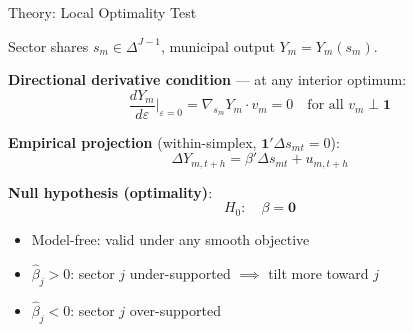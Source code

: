 \documentclass[aspectratio=169,11pt]{beamer}
\newcommand{\iotaVec}{\mathbf{1}}
\begin{document}
\begin{frame}{Theory: Local Optimality Test}

Sector shares $s_m \in \Delta^{J-1}$, municipal output $Y_m = Y_m(s_m)$.

\medskip

\textbf{Directional derivative condition} --- at any interior optimum:
\begin{equation*}
    \frac{dY_m}{d\varepsilon}\bigg|_{\varepsilon=0}
    = \nabla_{s_m} Y_m \cdot v_m = 0
    \quad\text{for all } v_m \perp \iotaVec
\end{equation*}

\textbf{Empirical projection} (within-simplex, $\iotaVec'\Delta s_{mt}=0$):
\begin{equation*}
    \Delta Y_{m,t+h} = \beta' \Delta s_{mt} + u_{m,t+h}
\end{equation*}

\textbf{Null hypothesis (optimality)}:
\begin{equation*}
    H_0: \quad \beta = \mathbf{0}
\end{equation*}

\begin{itemize}
    \item Model-free: valid under any smooth objective
    \item $\hat\beta_j > 0$: sector $j$ under-supported $\implies$ tilt more toward $j$
    \item $\hat\beta_j < 0$: sector $j$ over-supported
\end{itemize}

\end{frame}
\end{document}
